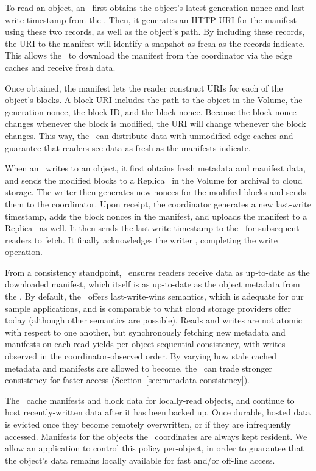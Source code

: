 To read an object, an \SG\ first obtains the object's latest generation nonce 
and last-write timestamp from the \MS.  Then, it generates an HTTP URI for the manifest using 
these two records, as well as the object's path.  By including these records,
the URI to the manifest will identify a snapshot as fresh as the records indicate.
This allows the \SG\ to download the manifest from the coordinator via the edge caches
and receive fresh data.

Once obtained, the manifest lets the reader construct 
URIs for each of the object's blocks.  A block URI
includes the path to the object in the Volume, the generation nonce,
the block ID, and the block nonce.  Because the block nonce 
changes whenever the block is modified, the URI will change whenever the block 
changes.  This way, the \SG\ can distribute data with unmodified 
edge caches and guarantee that readers see data as fresh as the manifests indicate.

When an \SG\ writes to an object, it first obtains fresh metadata and 
manifest data, and sends the modified blocks
to a Replica \SG\ in the Volume for archival to cloud storage.  The writer then generates 
new nonces for the modified blocks and sends them
to the coordinator.  Upon receipt, the coordinator generates a new last-write
timestamp, adds the block nonces in the manifest, and uploads the manifest to 
a Replica \SG\ as well.  It then sends the last-write timestamp
to the \MS\ for subsequent readers to fetch.
It finally acknowledges the writer \SG, completing the write operation.


From a consistency standpoint, \Syndicate\ 
ensures readers receive data as up-to-date as the downloaded manifest,
which itself is as up-to-date as the object metadata from the \MS.
By default, the \SG\ offers last-write-wins semantics, which is adequate for our sample
applications, and is comparable to what 
cloud storage providers offer today (although other semantics are possible).
Reads and writes are not atomic with respect to one another, but
synchronously fetching new metadata and manifests on each read
yields per-object sequential consistency, with writes observed in the
coordinator-observed order.  By varying how stale cached metadata 
and manifests are allowed to become, the \SG\ can trade stronger 
consistency for faster access (Section~\ref{sec:metadata-consistency}).

The \SGs\ cache manifests and
block data for locally-read objects, and continue to host
recently-written data 
after it has been backed up.
Once durable, hosted data is
evicted once they become remotely  
overwritten, or if they are infrequently
accessed.  Manifests for the objects 
the \SG\ coordinates are always kept resident.
We allow an application to 
control this policy per-object, in order
to guarantee that the object's data 
remains locally available for fast and/or off-line access.

